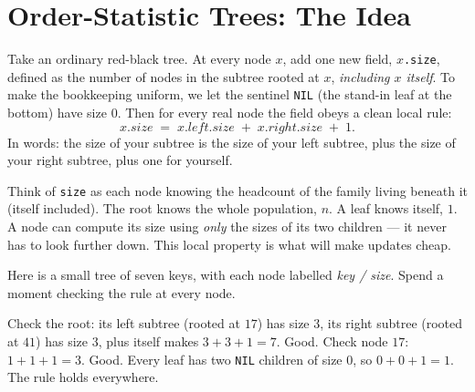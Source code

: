 \section{Order-Statistic Trees: The Idea}
\label{ch14:sec-ostree}

Take an ordinary red-black tree. At every node $x$, add one new field,
\texttt{$x$.size}, defined as the number of nodes in the subtree rooted at $x$,
\emph{including $x$ itself}. To make the bookkeeping uniform, we let the sentinel
\texttt{NIL} (the stand-in leaf at the bottom) have size $0$. Then for every real
node the field obeys a clean local rule:
\[
  x.\mathit{size} \;=\; x.\mathit{left}.\mathit{size} \;+\; x.\mathit{right}.\mathit{size} \;+\; 1.
\]
In words: the size of your subtree is the size of your left subtree, plus the
size of your right subtree, plus one for yourself.

\begin{intuitionbox}
Think of \texttt{size} as each node knowing the headcount of the family living
beneath it (itself included). The root knows the whole population, $n$. A leaf
knows itself, $1$. A node can compute its size using
\emph{only} the sizes of its two children --- it never has to look further
down. This local property is what will make updates cheap.
\end{intuitionbox}

Here is a small tree of seven keys, with each node labelled \emph{key /
size}. Spend a moment checking the rule at every node.

\begin{center}
\end{center}

Check the root: its left subtree (rooted at $17$) has size $3$, its right subtree
(rooted at $41$) has size $3$, plus itself makes $3+3+1 = 7$. Good. Check node
$17$: $1 + 1 + 1 = 3$. Good. Every leaf has two \texttt{NIL} children of size $0$,
so $0 + 0 + 1 = 1$. The rule holds everywhere.

